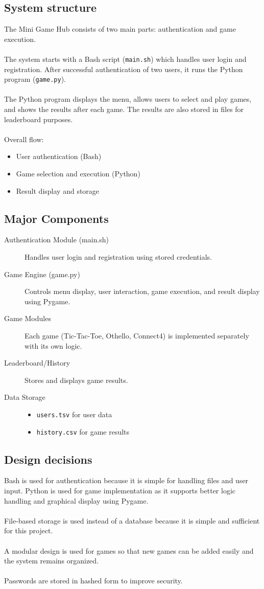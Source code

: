 \documentclass[12pt]{article}
\begin{document}
\subsection{System structure}
The Mini Game Hub consists of two main parts: authentication and game execution.\\\\
The system starts with a Bash script (\texttt{main.sh}) which handles user login and registration. After successful authentication of two users, it runs the Python program (\texttt{game.py}).\\\\
The Python program displays the menu, allows users to select and play games, and shows the results after each game. The results are also stored in files for leaderboard purposes.\\\\
Overall flow:
\begin{itemize}
\item User authentication (Bash)
\item Game selection and execution (Python)
\item Result display and storage
\end{itemize}

\subsection{Major Components}
\begin{description}
\item[Authentication Module (main.sh)] Handles user login and registration using stored credentials.
\item[Game Engine (game.py)] Controls menu display, user interaction, game execution, and result display using Pygame.
\item[Game Modules] Each game (Tic-Tac-Toe, Othello, Connect4) is implemented separately with its own logic.
\item[Leaderboard/History] Stores and displays game results.
\item[Data Storage] 
\begin{itemize}
\item \texttt{users.tsv} for user data
\item \texttt{history.csv} for game results
\end{itemize}
\end{description}
\subsection{Design decisions}
Bash is used for authentication because it is simple for handling files and user input. Python is used for game implementation as it supports better logic handling and graphical display using Pygame.\\\\
File-based storage is used instead of a database because it is simple and sufficient for this project.\\\\
A modular design is used for games so that new games can be added easily and the system remains organized.\\\\
Passwords are stored in hashed form to improve security.
\end{document}
